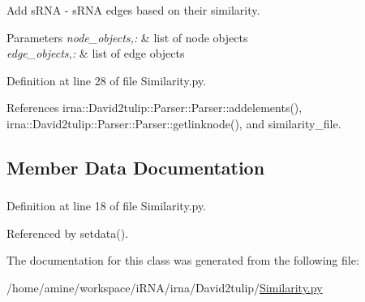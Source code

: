 \-Add s\-R\-N\-A -\/ s\-R\-N\-A edges based on their similarity. 


\begin{DoxyParams}{\-Parameters}
{\em node\-\_\-objects,\-:} & list of node objects \\
\hline
{\em edge\-\_\-objects,\-:} & list of edge objects \\
\hline
\end{DoxyParams}


\-Definition at line 28 of file \-Similarity.\-py.



\-References irna\-::\-David2tulip\-::\-Parser\-::\-Parser\-::addelements(), irna\-::\-David2tulip\-::\-Parser\-::\-Parser\-::getlinknode(), and similarity\-\_\-file.



\subsection{\-Member \-Data \-Documentation}
\hypertarget{classirna_1_1David2tulip_1_1Similarity_1_1Similarity_a3b7f3b913600221d5f7a735f147a8d29}{
\subsubsection[{similarity\-\_\-file}]{}}
\label{classirna_1_1David2tulip_1_1Similarity_1_1Similarity_a3b7f3b913600221d5f7a735f147a8d29}


\-Definition at line 18 of file \-Similarity.\-py.



\-Referenced by setdata().



\-The documentation for this class was generated from the following file\-:\begin{DoxyCompactItemize}
\item 
/home/amine/workspace/i\-R\-N\-A/irna/\-David2tulip/\hyperlink{Similarity_8py}{\-Similarity.\-py}\end{DoxyCompactItemize}
